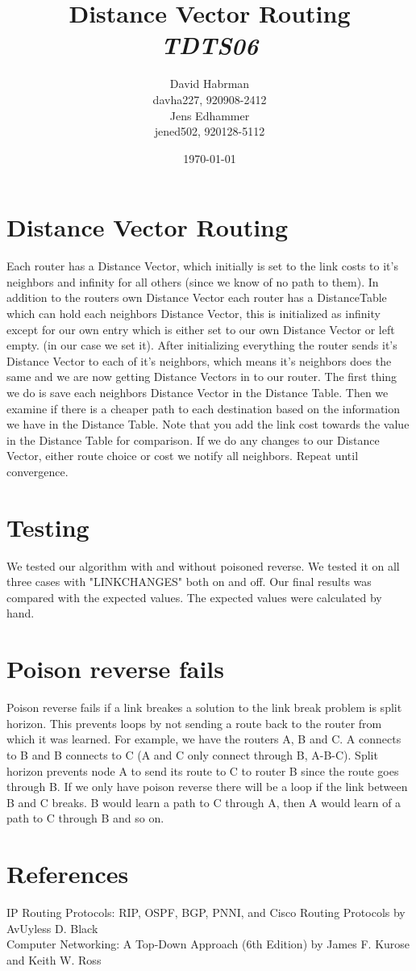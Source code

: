 \documentclass[10pt]{article}
\title{Distance Vector Routing\\
\emph{TDTS06}}
\author{David Habrman \\ davha227, 920908-2412\\
Jens Edhammer \\ jened502, 920128-5112 }
\date{\today}
\begin{document}
\maketitle

\newpage
\tableofcontents
\newpage

\section{Distance Vector Routing}
Each router has a Distance Vector, which initially is set to the link costs to it's neighbors and infinity for all others (since we know of no path to them). In addition to the routers own Distance Vector each router has a DistanceTable which can hold each neighbors Distance Vector, this is initialized as infinity except for our own entry which is either set to our own Distance Vector or left empty. (in our case we set it). After initializing everything the router sends it's Distance Vector to each of it's neighbors, which means it's neighbors does the same and we are now getting Distance Vectors in to our router. The first thing we do is save each neighbors Distance Vector in the Distance Table. Then we examine if there is a cheaper path to each destination based on the information we have in the Distance Table. Note that you add the link cost towards the value in the Distance Table for comparison. If we do any changes to our Distance Vector, either route choice or cost we notify all neighbors. Repeat until convergence. 

\section{Testing}
We tested our algorithm with and without poisoned reverse. We tested it on all
three cases with "LINKCHANGES" both on and off. Our final results was compared
with the expected values. The expected values were calculated by hand.

\section{Poison reverse fails}
Poison reverse fails if a link breakes a solution to the link break problem is
split horizon. This prevents loops by not sending a route back to the router
from which it was learned. For example, we have the routers A, B and C. A
connects to B and B connects to C (A and C only connect through B, A-B-C).
Split horizon prevents node A to send its route to C to router B since the
route goes through B. If we only have poison reverse there will be a loop
if the link between B and C breaks. B would learn a path to C through A,
then A would learn of a path to C through B and so on.

\section{References}
IP Routing Protocols: RIP, OSPF, BGP, PNNI, and Cisco Routing Protocols by  AvUyless D. Black \\
Computer Networking: A Top-Down Approach (6th Edition) by James F. Kurose and Keith W. Ross
\end{document}
